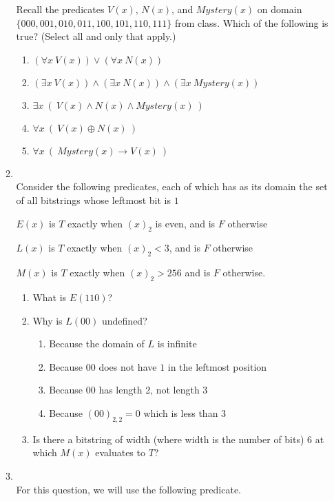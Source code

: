 \documentclass[12pt, oneside]{article}
\begin{document}
\begin{enumerate}
\begin{enumerate}
Recall the predicates $V(x)$, $N(x)$, and $Mystery(x)$
on domain $\{000,001,010,011,100,101,110,111\}$ from class.
Which of the following is true? (Select  all and only that apply.)
 \begin{enumerate}
    \item $\left( \forall x ~V(x) \right) \lor \left( \forall x ~N(x) \right)$
    \item $\left( \exists x ~V(x) \right) \land \left( \exists x~N(x) \right) \land \left( \exists x~Mystery(x)\right)$
    \item $\exists x ~(~V(x) \land N(x) \land Mystery(x)~)$
    \item $\forall x ~(~V(x) \oplus N(x)~)$
    \item $\forall x ~(~Mystery(x) \to V(x)~)$
 \end{enumerate}        \item \hspace{1in}\\ 

Consider the following predicates, each of which has 
as its domain the set of all bitstrings whose leftmost bit is $1$

$E(x)$ is $T$ exactly when $(x)_{2}$ is even, and is $F$ otherwise

$L(x)$ is $T$ exactly when $(x)_2 < 3$, and is $F$ otherwise

$M(x)$ is $T$ exactly when $(x)_2 > 256$ and is $F$ otherwise.

\begin{enumerate}
\item What is $E(110)$?
\item Why is $L(00)$ undefined?
\begin{enumerate}
\item Because the domain of $L$ is infinite
\item Because $00$ does not have $1$ in the leftmost position
\item Because $00$ has length 2, not length 3
\item Because $(00)_{2,2} = 0$ which is less than $3$
\end{enumerate}
\item Is there a bitstring of width (where width is the number of bits) $6$ at which $M(x)$ evaluates 
to $T$?
\end{enumerate}     \item \hspace{1in}\\ 

For this question, we will use the following predicate.


\end{enumerate}
\end{enumerate}
\end{document}
